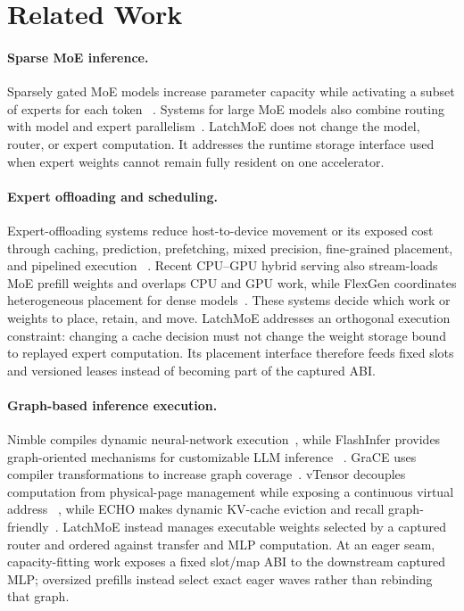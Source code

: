 \section{Related Work}
\label{sec:related}

\paragraph{Sparse MoE inference.}
Sparsely gated MoE models increase parameter capacity while activating a
subset of experts for each token
~\cite{shazeer2017outrageously,fedus2022switch,du2022glam,rajbhandari2022deepspeedmoe}.
Systems for large MoE models also combine routing with model and expert
parallelism~\cite{rajbhandari2022deepspeedmoe,li2023lina}. LatchMoE does not
change the model, router, or expert computation. It addresses the runtime
storage interface used when expert weights cannot remain fully resident on one
accelerator.

\paragraph{Expert offloading and scheduling.}
Expert-offloading systems reduce host-to-device movement or its exposed cost
through caching, prediction, prefetching, mixed precision, fine-grained
placement, and pipelined execution
~\cite{hwang2024pregated,xue2024moeinfinity,kong2024swapmoe,song2024promoe,tang2024hobbit,cao2025moelightning,fang2025klotski,li2026commitmoe}.
Recent CPU--GPU hybrid serving also stream-loads MoE prefill weights and
overlaps CPU and GPU work, while FlexGen coordinates heterogeneous placement
for dense models~\cite{cloudmoe2026,flexgen}. These systems decide which work or
weights to place, retain, and move. LatchMoE addresses an orthogonal execution
constraint: changing a cache decision must not change the weight storage bound
to replayed expert computation. Its placement interface therefore feeds fixed
slots and versioned leases instead of becoming part of the captured ABI.

\paragraph{Graph-based inference execution.}
Nimble compiles dynamic neural-network execution~\cite{kwon2020nimble}, while
FlashInfer provides graph-oriented mechanisms for customizable LLM inference
~\cite{ye2025flashinfer}. GraCE uses compiler transformations to
increase graph coverage~\cite{grace2026}. vTensor decouples computation from
physical-page management while exposing a continuous virtual address
~\cite{vtensor2024}, while ECHO makes dynamic KV-cache eviction and recall
graph-friendly~\cite{echo2026}. LatchMoE instead
manages executable weights selected by a captured router and ordered against
transfer and MLP computation. At an eager seam, capacity-fitting work exposes a
fixed slot/map ABI to the downstream captured MLP; oversized prefills instead
select exact eager waves rather than rebinding that graph.

